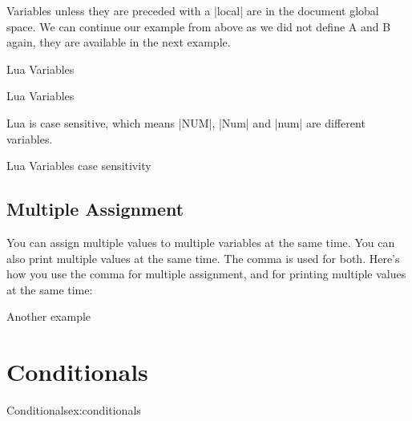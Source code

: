 Variables unless they are preceded with a |local| are in the document global space. We can continue our example from above as we did not define A and B again, they are available in the next example.

\begin{texexample}{Lua Variables}{}
\end{texexample}

\begin{texexample}{Lua Variables}{}

\def\abadd#1#2{%
  \luadirect{
     A = #1 + #2
     tex.print(A)}
}

\abadd{100}{925.56}
\end{texexample}



Lua is case sensitive, which means |NUM|, |Num| and |num| are different variables.

\begin{texexample}{Lua Variables case sensitivity}{}
\end{texexample}


\subsection{Multiple Assignment}

You can assign multiple values to multiple variables at the same time. You can also print multiple values
at the same time. The comma is used for both. Here's how you use the comma for multiple assignment, and for printing multiple values at the same time:

\begin{texexample}{Another example}{}
\end{texexample}





\section{Conditionals}
\begin{texexample}{Conditionals}{ex:conditionals}
\end{texexample}


